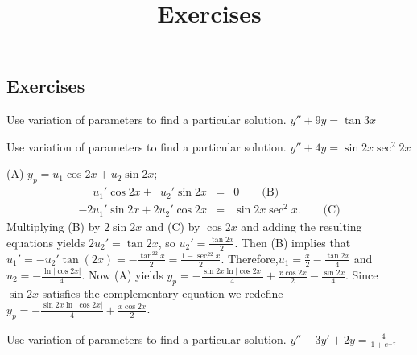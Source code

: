 \documentclass{ximera}
\title{Exercises} \license{CC BY-NC-SA 4.0}
\begin{document}
\begin{abstract}
\end{abstract}
\maketitle

\begin{onlineOnly}
\section*{Exercises}
\end{onlineOnly}


\begin{problem}\label{exer:5.7.1} Use variation of parameters to find a particular solution. $y''+9y=\tan 3x$
\end{problem}

\begin{problem}\label{exer:5.7.2} Use variation of parameters to find a particular solution. $y''+4y=\sin 2x\sec^2 2x$

\begin{solution}
    (A) $y_p=u_1\cos2x+u_2\sin2x$;
\setcounter{equation}{1}
\begin{eqnarray*}
\phantom{-2}u_1'\cos
2x+\phantom{2}u_2'\sin2x&=&0\qquad\text{(B)}\\ %
-2u_1'\sin2x+2u_2'\cos 2x&=&\sin2x\sec^2x.\qquad \text{(C)} %
\end{eqnarray*}
Multiplying (B) by $2\sin2x$ and (C)
by $\cos2x$ and adding the resulting equations yields $2u_2'=\tan2x$,
so $u_2'=\frac{\tan2x}{2}$. Then (B) implies that
$u_1'=-u_2'\tan(2x)=-\frac{\tan^22x}{2}=\frac{1-\sec^22x}{2}$.
Therefore,$u_1=\frac{x}{2}-\frac{\tan2x}{4}$ and
$u_2=-\frac{\ln|\cos2x|}{4}$. Now (A) yields $y_p=-\frac{\sin
2x\ln|\cos 2x|}{4} +\frac{x\cos 2x}{2}-\frac{\sin2x}{4}$. Since
$\sin2x$ satisfies the complementary equation we redefine
$y_p=-\frac{\sin 2x\ln|\cos 2x|}{4} +\frac{x\cos 2x}{2}$.
\end{solution}
\end{problem}

\begin{problem}\label{exer:5.7.3}  Use variation of parameters to find a particular solution. $y''-3y'+2y=\frac{4}{1+e^{-x}}$
\end{problem}
\end{document}
